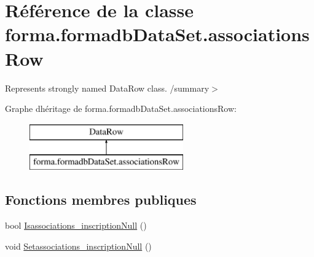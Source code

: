 \hypertarget{classforma_1_1formadb_data_set_1_1associations_row}{}\section{Référence de la classe forma.\+formadb\+Data\+Set.\+associations\+Row}
\label{classforma_1_1formadb_data_set_1_1associations_row}


Represents strongly named Data\+Row class. /summary$>$  


Graphe d\textquotesingle{}héritage de forma.\+formadb\+Data\+Set.\+associations\+Row\+:\begin{figure}[H]
\begin{center}
\leavevmode
\includegraphics[height=2.000000cm]{classforma_1_1formadb_data_set_1_1associations_row}
\end{center}
\end{figure}
\subsection*{Fonctions membres publiques}
\begin{DoxyCompactItemize}
\item 
bool \hyperlink{classforma_1_1formadb_data_set_1_1associations_row_a5294e84215b3e33bc1748f463e7f99c4}{Isassociations\+\_\+inscription\+Null} ()
\item 
void \hyperlink{classforma_1_1formadb_data_set_1_1associations_row_a95f48b4b1482711029bf82658c0b6935}{Setassociations\+\_\+inscription\+Null} ()
\end{DoxyCompactItemize}
